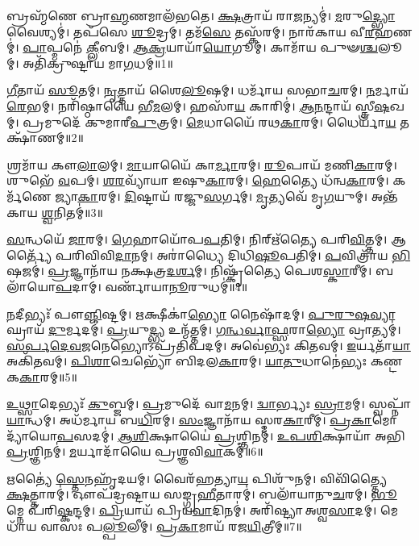 𑌬𑍍𑌰𑌹𑍍𑌮᳴𑌣𑍇 𑌬𑍍𑌰𑌾\-\ul{𑌹𑍍𑌮}\-𑌣𑌮𑌾𑌲᳴𑌭𑌤𑍇।
\-\ul{𑌕𑍍𑌷}\-𑌤𑍍𑌰𑌾𑌯᳴ 𑌰𑌾\-\ul{𑌜}\-𑌨𑍍𑌯𑌮𑍍॑।
\-\ul{𑌮}\-𑌰𑍁\-\ul{𑌦𑍍𑌭𑍍𑌯𑍋} 𑌵𑍈𑌶𑍍𑌯𑌮𑍍॑।
𑌤𑌪᳴𑌸𑍇 \ul{𑌶𑍂}\-𑌦𑍍𑌰𑌮𑍍।
𑌤𑌮᳴\-\ul{𑌸𑍇} 𑌤𑌸𑍍𑌕᳴𑌰𑌮𑍍।
𑌨𑌾𑌰᳴𑌕𑌾𑌯 𑌵𑍀\-\ul{𑌰}\-𑌹𑌣𑌮𑍍॑।
\-\ul{𑌪𑌾}\-𑌪𑍍𑌮𑌨𑍇॑ \ul{𑌕𑍍𑌲𑍀}\-𑌬𑌮𑍍।
\-\ul{𑌆}\-\-\ul{𑌕𑍍𑌰}\-𑌯𑌾𑌯𑌾᳴\-\ul{𑌯𑍋}\-𑌗𑍂𑌮𑍍।
𑌕𑌾𑌮𑌾᳴𑌯 𑌪𑍁𑍟\-\ul{𑌶𑍍𑌚}\-𑌲𑍂𑌮𑍍।
𑌅𑌤𑌿᳴𑌕𑍍𑌰𑍁𑌷𑍍𑌟𑌾𑌯 𑌮𑌾\-\ul{𑌗}\-𑌧𑌮𑍍॥1॥

\-\ul{𑌗𑍀}\-𑌤𑌾𑌯᳴ \ul{𑌸𑍂}\-𑌤𑌮𑍍।
\-\ul{𑌨𑍃}\-𑌤𑍍𑌤𑌾𑌯᳴ 𑌶𑍈\-\ul{𑌲𑍂}\-𑌷𑌮𑍍।
𑌧𑌰𑍍𑌮𑌾᳴𑌯 𑌸𑌭𑌾\-\ul{𑌚}\-𑌰𑌮𑍍।
\-\ul{𑌨}\-𑌰𑍍𑌮𑌾𑌯᳴ \ul{𑌰𑍇}\-𑌭𑌮𑍍।
𑌨𑌰𑌿᳴𑌷𑍍𑌠𑌾𑌯𑍈 𑌭𑍀\-\ul{𑌮}\-𑌲𑌮𑍍।
𑌹𑌸𑌾᳴\-\ul{𑌯} 𑌕𑌾𑌰𑌿𑌮𑍍॑।
\-\ul{𑌆}\-\-\ul{𑌨}\-𑌨𑍍𑌦𑌾𑌯᳴ 𑌸𑍍𑌤𑍍𑌰𑍀\-\ul{𑌷}\-𑌖𑌮𑍍।
𑌪𑍍𑌰𑌮𑍁𑌦𑍇᳴ 𑌕𑍁𑌮𑌾𑌰𑍀\-\ul{𑌪𑍁}\-𑌤𑍍𑌰𑌮𑍍।
\-\ul{𑌮𑍇}\-𑌧𑌾𑌯𑍈᳴ 𑌰𑌥\-\ul{𑌕𑌾}\-𑌰𑌮𑍍।
𑌧𑍈𑌰𑍍𑌯𑌾᳴\-\ul{𑌯} 𑌤𑌕𑍍𑌷𑌾᳴𑌣𑌮𑍍॥2॥

𑌶𑍍𑌰𑌮𑌾᳴𑌯 𑌕𑍗\-\ul{𑌲𑌾}\-𑌲𑌮𑍍।
\-\ul{𑌮𑌾}\-𑌯𑌾𑌯𑍈᳴ 𑌕𑌾\-\ul{𑌰𑍍𑌮𑌾}\-𑌰𑌮𑍍।
\-\ul{𑌰𑍂}\-𑌪𑌾𑌯᳴ 𑌮𑌣𑌿\-\ul{𑌕𑌾}\-𑌰𑌮𑍍।
𑌶𑍁𑌭𑍇᳴ \ul{𑌵}\-𑌪𑌮𑍍।
\-\ul{𑌶}\-\-\ul{𑌰}\-𑌵𑍍𑌯𑌾᳴𑌯𑌾 𑌇𑌷𑍁\-\ul{𑌕𑌾}\-𑌰𑌮𑍍।
\-\ul{𑌹𑍇}\-𑌤𑍍𑌯𑍈 𑌧᳴𑌨𑍍𑌵\-\ul{𑌕𑌾}\-𑌰𑌮𑍍।
𑌕𑌰𑍍𑌮᳴𑌣𑍇 𑌜𑍍𑌯𑌾\-\ul{𑌕𑌾}\-𑌰𑌮𑍍।
\-\ul{𑌦𑌿}\-𑌷𑍍𑌟𑌾𑌯᳴ 𑌰𑌜𑍍𑌜𑍁\-\ul{𑌸}\-𑌰𑍍𑌗𑌮𑍍।
\-\ul{𑌮𑍃}\-𑌤𑍍𑌯𑌵𑍇᳴ 𑌮𑍃\-\ul{𑌗}\-𑌯𑍁𑌮𑍍।
𑌅𑌨𑍍𑌤᳴𑌕𑌾𑌯 \ul{𑌶𑍍𑌵}\-𑌨𑌿𑌤𑌮𑍍॑॥3॥

\-\ul{𑌸}\-𑌨𑍍𑌧𑌯𑍇᳴ \ul{𑌜𑌾}\-𑌰𑌮𑍍।
\-\ul{𑌗𑍇}\-𑌹𑌾𑌯𑍋᳴𑌪\-\ul{𑌪}\-𑌤𑌿𑌮𑍍।
𑌨𑌿𑌰𑍍\mbox{}𑌋᳴𑌤𑍍𑌯𑍈 𑌪𑌰𑌿\-\ul{𑌵𑌿}\-𑌤𑍍𑌤𑌮𑍍।
𑌆𑌰𑍍𑌤𑍍𑌯𑍈᳴ 𑌪𑌰𑌿𑌵𑌿𑌵𑌿\-\ul{𑌦𑌾}\-𑌨𑌮𑍍।
𑌅𑌰𑌾॑𑌧𑍍𑌯𑍈 𑌦𑌿𑌧𑌿\-\ul{𑌷𑍂}\-𑌪𑌤𑌿𑌮𑍍॑।
\-\ul{𑌪}\-𑌵𑌿𑌤𑍍𑌰𑌾᳴𑌯 \ul{𑌭𑌿}\-𑌷𑌜𑌮𑍍॑।
\-\ul{𑌪𑍍𑌰}\-𑌜𑍍𑌞𑌾𑌨𑌾᳴𑌯 𑌨𑌕𑍍𑌷𑌤𑍍𑌰\-\ul{𑌦}\-\-\ul{𑌰𑍍}\-𑌶𑌮𑍍।
𑌨𑌿𑌷𑍍𑌕𑍃᳴𑌤𑍍𑌯𑍈 𑌪𑍇𑌶\-\ul{𑌸𑍍𑌕𑌾}\-𑌰𑍀𑌮𑍍।
𑌬𑌲𑌾᳴𑌯𑍋\-\ul{𑌪}\-𑌦𑌾𑌮𑍍।
𑌵𑌰𑍍𑌣𑌾᳴𑌯𑌾\-\ul{𑌨𑍂}\-𑌰𑍁𑌧𑌮𑍍॑॥4॥

\-\ul{𑌨}\-𑌦𑍀𑌭𑍍𑌯𑌃᳴ 𑌪𑍗\-\ul{𑌞𑍍𑌜𑌿}\-𑌷𑍍𑌟𑌮𑍍।
\-\ul{𑌋}\-𑌕𑍍𑌷𑍀𑌕𑌾॑\-\ul{𑌭𑍍𑌯𑍋} 𑌨𑍈𑌷𑌾᳴𑌦𑌮𑍍।
\-\ul{𑌪𑍁}\-\-\ul{𑌰𑍁}\-\-\ul{𑌷}\-\-\ul{𑌵𑍍𑌯𑌾}\-𑌘𑍍𑌰𑌾𑌯᳴ \ul{𑌦𑍁}\-𑌰𑍍𑌮𑌦𑌮𑍍॑।
\-\ul{𑌪𑍍𑌰}\-𑌯𑍁\-\ul{𑌦𑍍𑌭𑍍𑌯} 𑌉𑌨𑍍𑌮᳴𑌤𑍍𑌤𑌮𑍍।
\-\ul{𑌗}\-\-\ul{𑌨𑍍𑌧}\-\-\ul{𑌰𑍍𑌵𑌾}\-\-\ul{𑌫𑍍𑌸}\-𑌰𑌾\-\ul{𑌭𑍍𑌯𑍋} 𑌵𑍍𑌰𑌾𑌤𑍍𑌯𑌮𑍍॑।
\-\ul{𑌸}\-\-\ul{𑌰𑍍𑌪}\-\-\ul{𑌦𑍇}\-\-\ul{𑌵}\-\-\-\ul{𑌜}\-𑌨𑍇𑌭𑍍𑌯𑍋\-𑌽𑌪𑍍𑌰᳴𑌤𑌿𑌪𑌦𑌮𑍍।
𑌅𑌵𑍇॑𑌭𑍍𑌯𑌃 𑌕𑌿\-\ul{𑌤}\-𑌵𑌮𑍍।
\-\ul{𑌇}\-𑌰𑍍𑌯𑌤𑌾᳴\-\ul{𑌯𑌾} 𑌅𑌕𑌿᳴𑌤𑌵𑌮𑍍।
\-\ul{𑌪𑌿}\-\-\ul{𑌶𑌾}\-𑌚𑍇𑌭𑍍𑌯𑍋᳴ 𑌬𑌿𑌦𑌲\-\ul{𑌕𑌾}\-𑌰𑌮𑍍।
\-\ul{𑌯𑌾}\-\-\ul{𑌤𑍁}\-𑌧𑌾𑌨𑍇॑𑌭𑍍𑌯𑌃 𑌕𑌣𑍍𑌟𑌕\-\ul{𑌕𑌾}\-𑌰𑌮𑍍॥5॥

\-\ul{𑌉}\-\-\ul{𑌥𑍍𑌸𑌾}\-𑌦𑍇𑌭𑍍𑌯𑌃᳴ \ul{𑌕𑍁}\-𑌬𑍍𑌜𑌮𑍍।
\-\ul{𑌪𑍍𑌰}\-𑌮𑍁𑌦𑍇᳴ 𑌵𑌾\-\ul{𑌮}\-𑌨𑌮𑍍।
\-\ul{𑌦𑍍𑌵𑌾}\-𑌰𑍍𑌭𑍍𑌯𑌃 \ul{𑌸𑍍𑌰𑌾}\-𑌮𑌮𑍍।
𑌸𑍍𑌵𑌪𑍍𑌨𑌾᳴\-\ul{𑌯𑌾}\-𑌨𑍍𑌧𑌮𑍍।
𑌅𑌧᳴𑌰𑍍𑌮𑌾𑌯 𑌬\-\ul{𑌧𑌿}\-𑌰𑌮𑍍।
\-\ul{𑌸𑌂}\-𑌜𑍍𑌞𑌾𑌨𑌾᳴𑌯 𑌸𑍍𑌮𑌰\-\ul{𑌕𑌾}\-𑌰𑍀𑌮𑍍।
\-\ul{𑌪𑍍𑌰}\-\-\ul{𑌕𑌾}\-𑌮𑍋𑌦𑍍𑌯𑌾᳴𑌯𑍋\-\ul{𑌪}\-𑌸𑌦𑌮𑍍॑।
\-\ul{𑌆}\-\-\ul{𑌶𑌿}\-𑌕𑍍𑌷𑌾𑌯𑍈॑ \ul{𑌪𑍍𑌰}\-𑌶𑍍𑌞𑌿𑌨𑌮𑍍॑।
\-\ul{𑌉}\-\-\ul{𑌪}\-\-\ul{𑌶𑌿}\-𑌕𑍍𑌷𑌾𑌯𑌾᳴ 𑌅𑌭𑌿\-\ul{𑌪𑍍𑌰}\-𑌶𑍍𑌞𑌿𑌨𑌮𑍍॑।
\-\ul{𑌮}\-𑌰𑍍𑌯𑌾𑌦𑌾᳴𑌯𑍈 𑌪𑍍𑌰𑌶𑍍𑌞𑌵𑌿\-\ul{𑌵𑌾}\-𑌕𑌮𑍍॥6॥

𑌋𑌤𑍍𑌯𑍈॑ \ul{𑌸𑍍𑌤𑍇}\-𑌨𑌹𑍃᳴𑌦𑌯𑌮𑍍।
𑌵𑍈𑌰᳴𑌹𑌤𑍍𑌯𑌾\-\ul{𑌯} 𑌪𑌿𑌶𑍁᳴𑌨𑌮𑍍।
𑌵𑌿𑌵𑌿᳴𑌤𑍍𑌤𑍍𑌯𑍈 \ul{𑌕𑍍𑌷}\-𑌤𑍍𑌤𑌾𑌰𑌮𑍍॑।
𑌔𑌪᳴𑌦𑍍𑌰𑌷𑍍𑌟𑌾𑌯 𑌸𑌙𑍍𑌗𑍍𑌰\-\ul{𑌹𑍀}\-𑌤𑌾𑌰𑌮𑍍॑।
𑌬𑌲𑌾᳴𑌯𑌾𑌨𑍁\-\ul{𑌚}\-𑌰𑌮𑍍।
\-\ul{𑌭𑍂}\-𑌮𑍍𑌨𑍇 𑌪᳴𑌰𑌿\-\ul{𑌷𑍍𑌕}\-𑌨𑍍𑌦𑌮𑍍।
\-\ul{𑌪𑍍𑌰𑌿}\-𑌯𑌾𑌯᳴ 𑌪𑍍𑌰𑌿𑌯\-\ul{𑌵𑌾}\-𑌦𑌿𑌨𑌮𑍍॑।
𑌅𑌰𑌿᳴𑌷𑍍𑌟𑍍𑌯𑌾 𑌅𑌶𑍍𑌵\-\ul{𑌸𑌾}\-𑌦𑌮𑍍।
𑌮𑍇𑌧𑌾᳴𑌯 𑌵𑌾𑌸𑌃 𑌪\-\ul{𑌲𑍍𑌪𑍂}\-𑌲𑍀𑌮𑍍।
\-\ul{𑌪𑍍𑌰}\-\-\ul{𑌕𑌾}\-𑌮𑌾𑌯᳴ 𑌰𑌜\-\ul{𑌯𑌿}\-𑌤𑍍𑌰𑍀𑌮𑍍॥7॥

